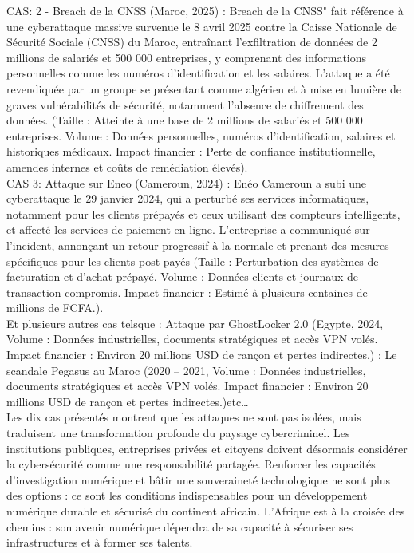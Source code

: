 \documentclass[]{article}
\begin{document}
CAS: 2 - Breach de la CNSS (Maroc, 2025) : Breach de la CNSS" fait référence à une cyberattaque massive survenue le 8 avril 2025 contre la Caisse Nationale de Sécurité Sociale (CNSS) du Maroc, entraînant l'exfiltration de données de 2 millions de salariés et 500 000 entreprises, y comprenant des informations personnelles comme les numéros d'identification et les salaires. L'attaque a été revendiquée par un groupe se présentant comme algérien et à mise en lumière de graves vulnérabilités de sécurité, notamment l'absence de chiffrement des données. (Taille : Atteinte à une base de 2 millions de salariés et 500 000 entreprises. Volume : Données personnelles, numéros d’identification, salaires et historiques médicaux. Impact financier : Perte de confiance institutionnelle, amendes internes et coûts de remédiation élevés).\\
CAS 3: Attaque sur Eneo (Cameroun, 2024) : Enéo Cameroun a subi une cyberattaque le 29 janvier 2024, qui a perturbé ses services informatiques, notamment pour les clients prépayés et ceux utilisant des compteurs intelligents, et affecté les services de paiement en ligne. L'entreprise a communiqué sur l'incident, annonçant un retour progressif à la normale et prenant des mesures spécifiques pour les clients post payés (Taille : Perturbation des systèmes de facturation et d’achat prépayé. Volume : Données clients et journaux de transaction compromis. Impact financier : Estimé à plusieurs centaines de millions de FCFA.).\\
Et plusieurs autres cas telsque : Attaque par GhostLocker 2.0 (Egypte, 2024, Volume : Données industrielles, documents stratégiques et accès VPN volés. Impact financier : Environ 20 millions USD de rançon et pertes indirectes.) ; Le scandale Pegasus au Maroc (2020 – 2021, Volume : Données industrielles, documents stratégiques et accès VPN volés. Impact financier : Environ 20 millions USD de rançon et pertes indirectes.)etc…\\
Les dix cas présentés montrent que les attaques ne sont pas isolées, mais traduisent une transformation profonde du paysage cybercriminel. Les institutions publiques, entreprises privées et citoyens doivent désormais considérer la cybersécurité comme une responsabilité partagée. Renforcer les capacités d’investigation numérique et bâtir une souveraineté technologique ne sont plus des options : ce sont les conditions indispensables pour un développement numérique durable et sécurisé du continent africain. L’Afrique est à la croisée des chemins : son avenir numérique dépendra de sa capacité à sécuriser ses infrastructures et à former ses talents.
\end{document}
